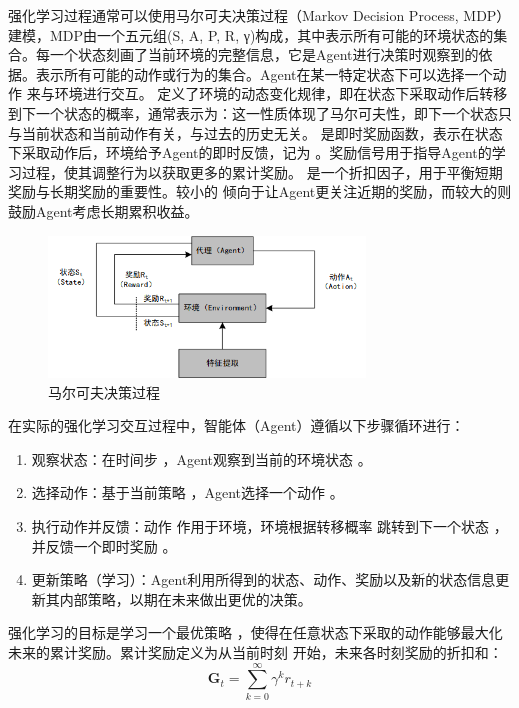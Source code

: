 强化学习过程通常可以使用马尔可夫决策过程（Markov Decision Process, MDP）建模，MDP由一个五元组(S, A, P, R, γ)构成，其中表示所有可能的环境状态的集合。每一个状态刻画了当前环境的完整信息，它是Agent进行决策时观察到的依据。表示所有可能的动作或行为的集合。Agent在某一特定状态下可以选择一个动作  来与环境进行交互。 定义了环境的动态变化规律，即在状态下采取动作后转移到下一个状态的概率，通常表示为：这一性质体现了马尔可夫性，即下一个状态只与当前状态和当前动作有关，与过去的历史无关。 是即时奖励函数，表示在状态  下采取动作后，环境给予Agent的即时反馈，记为 。奖励信号用于指导Agent的学习过程，使其调整行为以获取更多的累计奖励。 是一个折扣因子，用于平衡短期奖励与长期奖励的重要性。较小的  倾向于让Agent更关注近期的奖励，而较大的则鼓励Agent考虑长期累积收益。

\begin{figure}[hbt]
	\centering
	\includegraphics[width=0.75\textwidth]{figures/2.3}
	\caption{马尔可夫决策过程}\label{fig:2.3}
\end{figure}

在实际的强化学习交互过程中，智能体（Agent）遵循以下步骤循环进行：
\begin{enumerate} [label=\arabic*)] 
	
\item 观察状态：在时间步 ，Agent观察到当前的环境状态 。
\item 选择动作：基于当前策略 ，Agent选择一个动作 。
\item 执行动作并反馈：动作  作用于环境，环境根据转移概率  跳转到下一个状态 ，并反馈一个即时奖励 。
\item 更新策略（学习）：Agent利用所得到的状态、动作、奖励以及新的状态信息更新其内部策略，以期在未来做出更优的决策。

\end{enumerate}

强化学习的目标是学习一个最优策略 ，使得在任意状态下采取的动作能够最大化未来的累计奖励。累计奖励定义为从当前时刻  开始，未来各时刻奖励的折扣和：
\begin{equation}
	\label{eq:reward}
	\boldsymbol{G}_t = \sum_{k=0}^{\infty} \gamma^k r_{t+k}
\end{equation}

